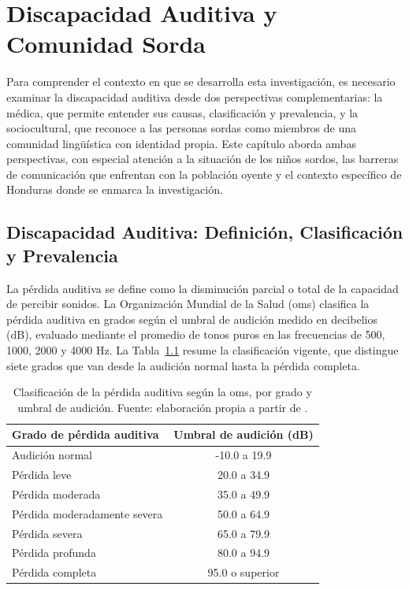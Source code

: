 \chapter{Discapacidad Auditiva y Comunidad Sorda}
\label{cp:discapacidad-auditiva}

\insertminitoc
\parindent0pt

Para comprender el contexto en que se desarrolla esta investigación, es necesario examinar
la discapacidad auditiva desde dos perspectivas complementarias: la médica, que permite
entender sus causas, clasificación y prevalencia, y la sociocultural, que reconoce a las
personas sordas como miembros de una comunidad lingüística con identidad propia. Este
capítulo aborda ambas perspectivas, con especial atención a la situación de los niños
sordos, las barreras de comunicación que enfrentan con la población oyente y el contexto
específico de Honduras donde se enmarca la investigación.

\section{Discapacidad Auditiva: Definición, Clasificación y Prevalencia}

La pérdida auditiva se define como la disminución parcial o total de la capacidad de
percibir sonidos. La Organización Mundial de la Salud (\acrshort{oms}) clasifica la pérdida auditiva
en grados según el umbral de audición medido en decibelios (dB), evaluado mediante el
promedio de tonos puros en las frecuencias de 500, 1000, 2000 y 4000 Hz. La
Tabla~\ref{tab:clasificacion-perdida-auditiva} resume la clasificación vigente, que
distingue siete grados que van desde la audición normal hasta la pérdida completa.

\begin{table}[h!]
\centering
\begin{tabular}{lc}
\hline
\textbf{Grado de pérdida auditiva} & \textbf{Umbral de audición (dB)} \\
\hline
Audición normal & -10.0 a 19.9 \\
Pérdida leve & 20.0 a 34.9 \\
Pérdida moderada & 35.0 a 49.9 \\
Pérdida moderadamente severa & 50.0 a 64.9 \\
Pérdida severa & 65.0 a 79.9 \\
Pérdida profunda & 80.0 a 94.9 \\
Pérdida completa & 95.0 o superior \\
\hline
\end{tabular}
\caption[Clasificación de la pérdida auditiva según la OMS]{Clasificación de la pérdida auditiva según la \acrshort{oms}, por grado y umbral de audición. Fuente: elaboración propia a partir de \cite{olusanya_hearing_2019}.}
\label{tab:clasificacion-perdida-auditiva}
\end{table}

